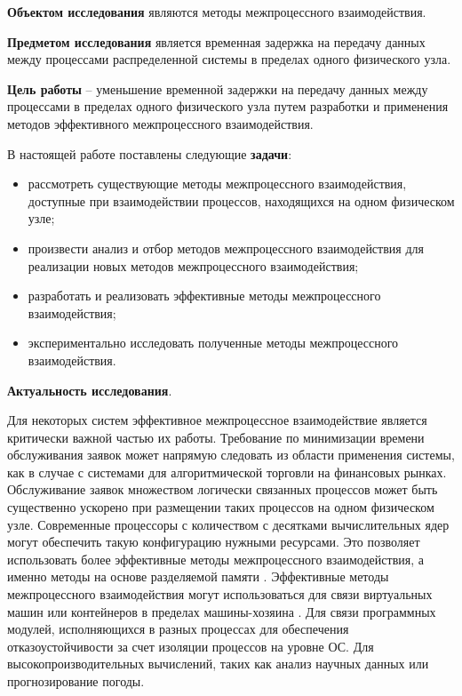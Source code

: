 \startprefacepage

\textbf{Объектом исследования} являются методы межпроцессного взаимодействия.

\textbf{Предметом исследования} является временная задержка на передачу данных между процессами распределенной системы в пределах одного физического узла.

\textbf{Цель работы} -- уменьшение временной задержки на передачу данных между процессами в пределах одного физического узла путем разработки и применения методов эффективного межпроцессного взаимодействия.

В настоящей работе поставлены следующие \textbf{задачи}:

\begin{itemize}
\item рассмотреть существующие методы межпроцессного взаимодействия, доступные при взаимодействии процессов, находящихся на одном физическом узле;
\item произвести анализ и отбор методов межпроцессного взаимодействия для реализации новых методов межпроцессного взаимодействия;
\item разработать и реализовать эффективные методы межпроцессного взаимодействия;
\item экспериментально исследовать полученные методы межпроцессного взаимодействия.
\end{itemize}

\textbf{Актуальность исследования}.

Для некоторых систем эффективное межпроцессное взаимодействие является критически важной частью их работы. Требование по минимизации времени обслуживания заявок может напрямую следовать из области применения системы, как в случае с системами для алгоритмической торговли на финансовых рынках. Обслуживание заявок множеством логически связанных процессов может быть существенно ускорено при размещении таких процессов на одном физическом узле. Современные процессоры с количеством с десятками вычислительных ядер могут обеспечить такую конфигурацию нужными ресурсами.
Это позволяет использовать более эффективные методы межпроцессного взаимодействия, а именно методы на основе разделяемой памяти \cite{Smith2012DraftH}.
Эффективные методы межпроцессного взаимодействия могут использоваться для связи виртуальных машин или контейнеров в пределах машины-хозяина \cite{IPCInterVirtualMachineShmem, IPCInterVirtualMachineShmemOptimizations}.
Для связи программных модулей, исполняющихся в разных процессах для обеспечения отказоустойчивости за счет изоляции процессов на уровне ОС. 
Для высокопроизводительных вычислений, таких как анализ научных данных или прогнозирование погоды.

